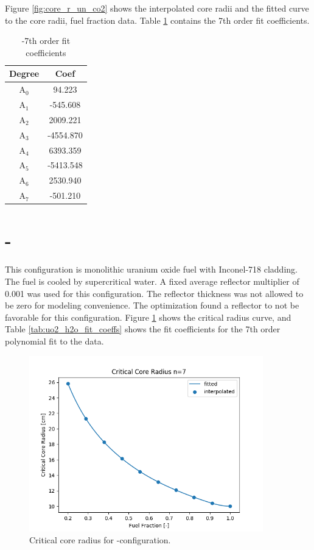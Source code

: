 Figure \ref{fig:core_r_un_co2} shows the interpolated core radii and the fitted
curve to the core radii, fuel fraction data. Table \ref{tab:un_co2_fit_coeffs}
contains the 7th order fit coefficients.

\begin{table}[h]
  \centering
  \caption{\uox-\codiox 7th order fit coefficients}
  \begin{tabular}{cc}
    \toprule
     Degree & Coef\\ 
    \midrule                                  
    A$_0$  &  94.223\\
    A$_1$  &  -545.608\\
    A$_2$  &  2009.221\\
    A$_3$  &  -4554.870\\
    A$_4$  &  6393.359\\
    A$_5$  &  -5413.548\\
    A$_6$  &  2530.940\\
    A$_7$  &  -501.210\\
  \end{tabular}
  \label{tab:un_co2_fit_coeffs}
\end{table}

\newpage
\section{\uox-\water}
This configuration is monolithic uranium oxide fuel with Inconel-718 cladding.
The fuel is cooled by supercritical water. A fixed average reflector multiplier
of 0.001 was used for this configuration. The reflector thickness was not
allowed to be zero for modeling convenience. The optimization found a
reflector to not be favorable for this configuration. Figure
\ref{fig:core_r_uo2_h2o} shows the critical radius curve, and Table
\ref{tab:uo2_h2o_fit_coeffs} shows the fit coefficients for the 7th order
polynomial fit to the data.

\begin{figure}[h]
    \centering
    \includegraphics[width=4in]{../images/core_r_uo2_h2o.png}
\caption{Critical core radius for \uox-\water configuration.}
\label{fig:core_r_uo2_h2o}
\end{figure}

